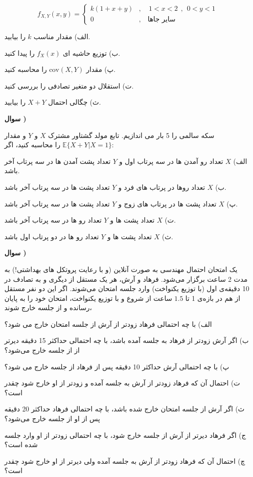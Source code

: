 \documentclass[10pt,letterpaper]{report}
\newcounter{questionnumber}
\newcommand{\Q}{
\textbf{سوال \thequestionnumber)}
\stepcounter{questionnumber}
}
\begin{document}
$$
f_{X,Y}(x,y)=\begin{cases}
k(1+x+y)&,\quad 1<x<2\ \ , \ \ 0<y<1\\
0&,\quad \text{سایر جاها}
\end{cases}
$$

الف) مقدار مناسب $k$ را بیابید.

ب) توزیع حاشیه ای 
$
f_X(x)
$
را پیدا کنید.

پ) مقدار 
$
\text{cov}(X,Y)
$
را محاسبه کنید.

ت) استقلال دو متغیر تصادفی را بررسی کنید.

ث) چگالی احتمال $X+Y$ را بیابید.

\Q
سکه سالمی را 5 بار می اندازیم. تابع مولد گشتاور مشترک $X$ و $Y$ و مقدار
$\mathbb{E}\{X+Y|X=1\}$
را محاسبه کنید، اگر:

الف) $X$ تعداد رو آمدن ها در سه پرتاب اول و $Y$ تعداد پشت آمدن ها در سه پرتاب آخر باشد.

ب) $X$ تعداد روها در پرتاب های فرد و $Y$ تعداد پشت ها در سه پرتاب آخر باشد.

پ) $X$ تعداد پشت ها در پرتاب های زوج و $Y$ تعداد پشت ها در سه پرتاب آخر باشد.

ت) $X$ تعداد پشت ها و $Y$ تعداد رو ها در سه پرتاب آخر باشد.

ث) $X$ تعداد پشت ها و $Y$ تعداد رو ها در دو پرتاب اول باشد.

\Q
یک امتحان احتمال مهندسی به صورت آنلاین (و با رعایت پروتکل های بهداشتی!) به مدت 2 ساعت برگزار می‌شود. فرهاد و آرش، هر یک مستقل از دیگری و به تصادف در 10 دقیقه‌ی اول (با توزیع یکنواخت) وارد جلسه امتحان می‌شوند. اگر این دو نفر مستقل از هم در بازه‌ی 1 تا $1.5$ ساعت از شروع و با توزیع یکنواخت، امتحان خود را به پایان رسانده و از جلسه خارج شوند،

الف) با چه احتمالی فرهاد زودتر از آرش از جلسه امتحان خارج می شود؟

ب) اگر آرش زودتر از فرهاد به جلسه آمده باشد، با چه احتمالی حداکثر 15 دقیقه دیرتر از از جلسه خارج می‌شود؟

پ) با چه احتمالی آرش حداکثر 10 دقیقه پس از فرهاد از جلسه خارج می شود؟

ت) احتمال آن که فرهاد زودتر از آرش به جلسه آمده و زودتر از او خارج شود چقدر است؟

ث) اگر آرش از جلسه امتحان خارج شده باشد، با چه احتمالی فرهاد حداکثر 20 دقیقه پس از او از جلسه خارج می‌شود؟

ج) اگر فرهاد دیرتر از آرش از جلسه خارج شود، با چه احتمالی زودتر از او وارد جلسه شده است؟

چ) احتمال آن که فرهاد زودتر از آرش به جلسه آمده ولی دیرتر از او خارج شود چقدر است؟
\end{document}

